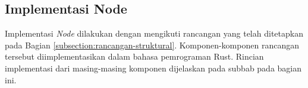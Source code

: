 \subsection{Implementasi Node}
\label{subsection:implementasi-node}

Implementasi \textit{Node} dilakukan dengan mengikuti rancangan yang telah ditetapkan pada Bagian \ref{subsection:rancangan-struktural}. Komponen-komponen rancangan tersebut diimplementasikan dalam bahasa pemrograman Rust. Rincian implementasi dari masing-masing komponen dijelaskan pada subbab pada bagian ini.





